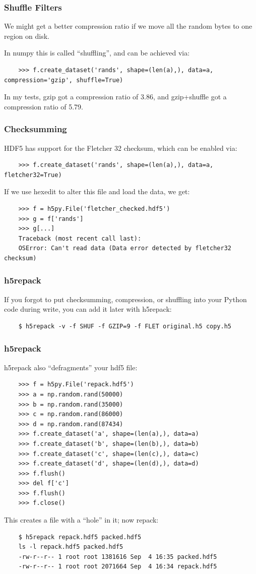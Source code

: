 \documentclass[9pt]{beamer}
\begin{document}
\begin{frame}[fragile]
  \frametitle{Shuffle Filters}
  We might get a better compression ratio if we move all the random bytes to one region on disk.

  In numpy this is called ``shuffling'', and can be achieved via:
  \begin{verbatim}
    >>> f.create_dataset('rands', shape=(len(a),), data=a, compression='gzip', shuffle=True)
  \end{verbatim}
  In my tests, gzip got a compression ratio of 3.86, and gzip+shuffle got a compression ratio of 5.79.    
\end{frame}

\begin{frame}[fragile]
  \frametitle{Checksumming}
  HDF5 has support for the Fletcher 32 checksum, which can be enabled via:
  \begin{verbatim}
    >>> f.create_dataset('rands', shape=(len(a),), data=a, fletcher32=True)
  \end{verbatim}
  If we use hexedit to alter this file and load the data, we get:
  \begin{verbatim}
    >>> f = h5py.File('fletcher_checked.hdf5')
    >>> g = f['rands']
    >>> g[...]
    Traceback (most recent call last):
    OSError: Can't read data (Data error detected by fletcher32 checksum)
  \end{verbatim}
\end{frame}

\begin{frame}[fragile]
  \frametitle{h5repack}
  If you forgot to put checksumming, compression, or shuffling into your Python code during write, you can add it later with h5repack:
  \begin{verbatim}
    $ h5repack -v -f SHUF -f GZIP=9 -f FLET original.h5 copy.h5
  \end{verbatim}
\end{frame}

\begin{frame}[fragile]
  \frametitle{h5repack}
  h5repack also ``defragments'' your hdf5 file:
  \begin{verbatim}
    >>> f = h5py.File('repack.hdf5')
    >>> a = np.random.rand(50000)
    >>> b = np.random.rand(35000)
    >>> c = np.random.rand(86000)
    >>> d = np.random.rand(87434)
    >>> f.create_dataset('a', shape=(len(a),), data=a)
    >>> f.create_dataset('b', shape=(len(b),), data=b)
    >>> f.create_dataset('c', shape=(len(c),), data=c)
    >>> f.create_dataset('d', shape=(len(d),), data=d)
    >>> f.flush()
    >>> del f['c']
    >>> f.flush()
    >>> f.close()
  \end{verbatim}
  This creates a file with a ``hole'' in it; now repack:
  \begin{verbatim}
    $ h5repack repack.hdf5 packed.hdf5
    ls -l repack.hdf5 packed.hdf5
    -rw-r--r-- 1 root root 1381616 Sep  4 16:35 packed.hdf5
    -rw-r--r-- 1 root root 2071664 Sep  4 16:34 repack.hdf5
  \end{verbatim}
  
\end{frame}
\end{document}
